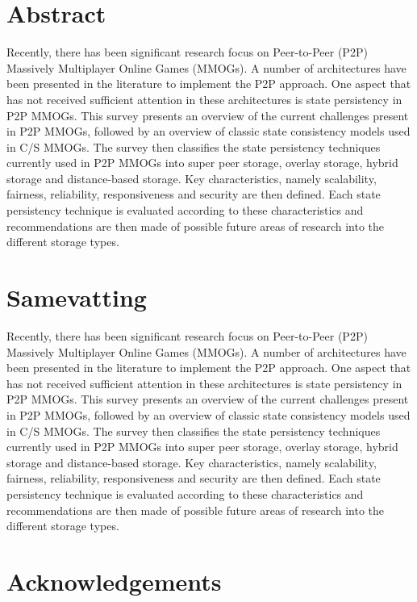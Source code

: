 
\chapter*{Abstract}
Recently, there has been significant research focus on Peer-to-Peer (P2P) Massively Multiplayer Online Games (MMOGs). A number of architectures have been presented in the literature to implement the P2P approach. One aspect that has not received sufficient attention in these architectures is state persistency in P2P MMOGs. This survey presents an overview of the current challenges present in P2P MMOGs, followed by an overview of classic state consistency models used in C/S MMOGs. The survey then classifies the state persistency techniques currently used in P2P MMOGs into super peer storage, overlay storage, hybrid storage and distance-based storage. Key characteristics, namely scalability, fairness, reliability, responsiveness and security are then defined. Each state persistency technique is evaluated according to these characteristics and recommendations are then made of possible future areas of research into the different storage types.


\chapter*{Samevatting}

Recently, there has been significant research focus on Peer-to-Peer (P2P) Massively Multiplayer Online Games (MMOGs). A number of architectures have been presented in the literature to implement the P2P approach. One aspect that has not received sufficient attention in these architectures is state persistency in P2P MMOGs. This survey presents an overview of the current challenges present in P2P MMOGs, followed by an overview of classic state consistency models used in C/S MMOGs. The survey then classifies the state persistency techniques currently used in P2P MMOGs into super peer storage, overlay storage, hybrid storage and distance-based storage. Key characteristics, namely scalability, fairness, reliability, responsiveness and security are then defined. Each state persistency technique is evaluated according to these characteristics and recommendations are then made of possible future areas of research into the different storage types.


\chapter{Acknowledgements}%

